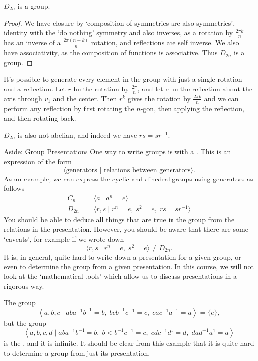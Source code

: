 \documentclass[a4paper]{scrartcl}
\begin{document}
\begin{proposition}
	$D_{2n}$ is a group.
\end{proposition}
\begin{proof}
	We have closure by `composition of symmetries are also symmetries', identity with the `do nothing' symmetry and also inverses, as a rotation by $\frac{2 \pi k}{n}$ has an inverse of a $\frac{2\pi(n - k)}{n}$ rotation, and reflections are self inverse. We also have associativity, as the composition of functions is associative. Thus $D_{2n}$ is a group. 
\end{proof}

It's possible to generate every element in the group with just a single rotation and a reflection. Let $r$ be the rotation by $\frac{2\pi}{n}$, and let $s$ be the reflection about the axis through $v_1$ and the center. Then $r^k$ gives the rotation by $\frac{2 \pi k}{n}$ and we can perform any reflection by first rotating the $n$-gon, then applying the reflection, and then rotating back. 

$D_{2n}$ is also not abelian, and indeed we have $rs = sr^{-1}$.

\begin{aside}{Aside: Group Presentations}
One way to write groups is with a . This is an expression of the form
$$
\langle \text{generators } \lvert \text{ relations between generators} \rangle.
$$
As an example, we can express the cyclic and dihedral groups using generators as follows
\begin{align*}
	C_n &= \langle a\mid  a^n = e \rangle \\
	D_{2n} &= \langle r, s \mid r^n = e,\; s^2 = e,\; rs = sr^{-1} \rangle
\end{align*}
You should be able to deduce all things that are true in the group from the relations in the presentation. However, you should be aware that there are some `caveats', for example if we wrote down
$$
\langle r, s \mid r^n = e, \; s^2 = e \rangle \neq D_{2n}.
$$
It is, in general, quite hard to write down a presentation for a given group, or even to determine the group from a given presentation. In this course, we will not look at the `mathematical tools' which allow us to discuss presentations in a rigorous 
way.

\begin{example}
	The group
	$$
	\left\langle a, b, c \mid a b a^{-1} b^{-1}=b, \; b c b^{-1} c^{-1}=c, \; cac^{-1} a^{-1}=a\right\rangle=\{e\},
	$$
	but the group
	$$
	\left\langle a, b, c, d \mid a b a^{-1} b^{-1}=b, \; b<b^{-1} c^{-1}=c,\; c d c^{-1} d^{1}=d, \; d a d^{-1} a^{1}=a\right\rangle
	$$
	is the , and it is infinite. It should be clear from this example that it is quite hard to determine a group from just its presentation.
\end{example}

\end{aside}
\end{document}

